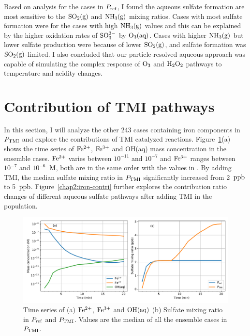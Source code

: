 \documentclass[edeposit,fullpage]{uiucthesis2009}
\makeatletter
\DeclareRobustCommand*\unit[1]
 {\ensuremath{%
   {\thinmuskip3mu\relax
    \def\mu{\text{\textmu}}\def~{\,}%
    \ifx\f@series\testbx\mathbf{#1}\else\mathrm{#1}\fi}}}
\makeatother
\begin{document}

Based on analysis for the cases in $P_{\rm ref}$, I found the aqueous sulfate formation are most sensitive to the $\rm SO_2(g)$ and $\rm NH_3(g)$ mixing ratios. Cases with most sulfate formation were for the cases with high $\rm NH_3(g)$ values and this can be explained by the higher oxidation rates of $\rm SO_3^{2-}$ by $\rm O_3(aq)$. Cases with higher $\rm NH_3(g)$ but lower sulfate production were because of lower $\rm SO_2(g)$, and sulfate formation was $\rm SO_2(g)$-limited. I also concluded that our particle-resolved aqueous approach was capable of simulating the complex response of $\rm O_3$ and $\rm H_2O_2$ pathways to temperature and acidity changes. 

\section{Contribution of TMI pathways}
\label{chap2.5}
In this section, I will analyze the other 243 cases containing iron components in $P_{\rm TMI}$ and explore the contributions of TMI catalyzed reactions. Figure~\ref{chap2:iron-conc}(a) shows the time series of $\rm Fe^{2+}$, $\rm Fe^{3+}$ and OH(aq) mass concentration in the ensemble cases. $\rm Fe^{2+}$ varies between $10^{-11}$ and $10^{-7}$ and $\rm Fe^{3+}$ ranges between $10^{-7}$ and $10^{-6}$~\unit{M}, both are in the same order with the values in \citep{Deguillaume2005}. By adding TMI, the median sulfate mixing ratio in $P_{\rm TMI}$ significantly increased from 2~\unit{ppb} to 5~\unit{ppb}. Figure~\ref{chap2:iron-contri} further explores the contribution ratio changes of different aqueous sulfate pathways after adding TMI in the population. 

\begin{figure}[ht]
    \centering \includegraphics[scale=0.55]{chap2_figs/chap2_with_tmi_fixOH_mass.pdf}
    \caption{Time series of (a) $\rm Fe^{2+}$, $\rm Fe^{3+}$ and $\rm OH(aq)$ (b) Sulfate mixing ratio in $P_{\rm ref}$ and $P_{\rm TMI}$. Values are the median of all the ensemble cases in $P_{\rm TMI}$. }
    \label{chap2:iron-conc}
\end{figure}
\end{document}
